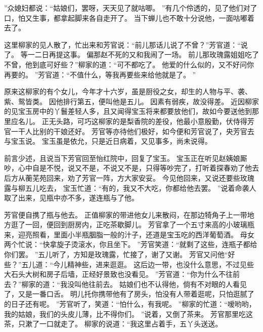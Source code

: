 ”众媳妇都说：“姑娘们，罢呀，天天见了就咕唧。
”有几个伶透的，见了他们对了口，怕又生事，都拿起脚来各自走开了。
当下蝉儿也不敢十分说他，一面咕嘟着去了。
\par
这里柳家的见人散了，忙出来和芳官说：“前儿那话儿说了不曾？”芳官道：“说了。
等一二日再提这事。
偏那赵不死的又和我闹了一场。
前儿那玫瑰露姐姐吃了不曾，他到底可好些？”柳家的道：“可不都吃了。
他爱的什么似的，又不好问你再要的。
”芳官道：“不值什么，等我再要些来给他就是了。
”\par
原来这柳家的有个女儿，今年才十六岁，虽是厨役之女，却生的人物与平、袭、紫、鸳皆类。
因他排行第五，便叫他是五儿。
因素有弱疾，故没得差。
近因柳家的见宝玉房中的丫鬟差轻人多，且又闻得宝玉将来都要放他们，故如今要送他到那里应名儿。
正无头路，可巧这柳家的是梨香院的差役，他最小意殷勤，伏侍得芳官一干人比别的干娘还好。
芳官等亦待他们极好，如今便和芳官说了，央芳官去与宝玉说。
宝玉虽是依允，只是近日病着，又见事多，尚未说得。
\par
前言少述，且说当下芳官回至怡红院中，回复了宝玉。
宝玉正在听见赵姨娘厮吵，心中自是不悦，说又不是，不说又不是，只得等吵完了，打听着探春劝了他去后方从蘅芜苑回来，劝了芳官一阵，方大家安妥。
今见他回来，又说还要些玫瑰露与柳五儿吃去，
宝玉忙道：“有的，我又不大吃，你都给他去罢。
”说着命袭人取了出来，见瓶中亦不多，遂连瓶与了他。
\par
芳官便自携了瓶与他去。
正值柳家的带进他女儿来散闷，在那边犄角子上一带地方逛了一回，便回到厨房内，正吃茶歇脚儿。
芳官拿了一个五寸来高的小玻璃瓶来，迎亮照看，里面小半瓶胭脂一般的汁子，还道是宝玉吃的西洋葡萄酒。
母女两个忙说：“快拿旋子烫滚水，你且坐下。
”芳官笑道：“就剩了这些，连瓶子都给你们罢。
”五儿听了，方知是玫瑰露，忙接了，谢了又谢。
芳官又问他“好些？”五儿道：“今儿精神些，进来逛逛。
这后边一带，也没什么意思，不过见些大石头大树和房子后墙，正经好景致也没看见。
”芳官道：“你为什么不往前去？”柳家的道：“我没叫他往前去。
姑娘们也不认得他，倘有不对眼的人看见了，又是一番口舌。
明儿托你携带他有了房头，怕没有人带着逛呢，只怕逛腻了的日子还有呢。
”芳官听了，笑道：“怕什么，有我呢。
”柳家的忙道：“嗳哟哟，我的姑娘，我们的头皮儿薄，比不得你们。
”说着，又倒了茶来。
芳官那里吃这茶，只漱了一口就走了。
柳家的说道：“我这里占着手，五丫头送送。
